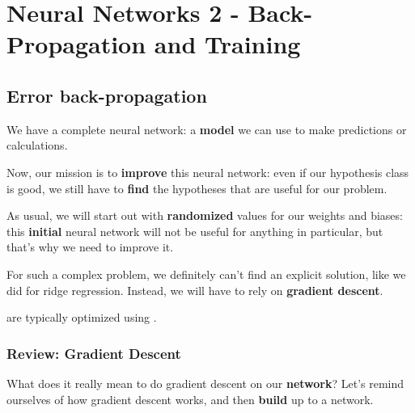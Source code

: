 \setcounter{chapter}{6-1}

\chapter{Neural Networks 2 - Back-Propagation and Training}


\setcounter{section}{4}
\section{Error back-propagation }

    We have a complete neural network: a \textbf{model} we can use to make predictions or calculations.
    
    Now, our mission is to \textbf{improve} this neural network: even if our hypothesis class is good, we still have to \textbf{find} the hypotheses that are useful for our problem.
    
    As usual, we will start out with \textbf{randomized} values for our weights and biases: this \textbf{initial} neural network will not be useful for anything in particular, but that's why we need to improve it.
    
    For such a complex problem, we definitely can't find an explicit solution, like we did for ridge regression. Instead, we will have to rely on \textbf{gradient descent}.\\
    
    \begin{concept}
         are typically optimized using .
    \end{concept}
    
    \phantom{}
    
    \subsection{Review: Gradient Descent}
    
        What does it really mean to do gradient descent on our \textbf{network}? Let's remind ourselves of how gradient descent works, and then \textbf{build} up to a network.
        
